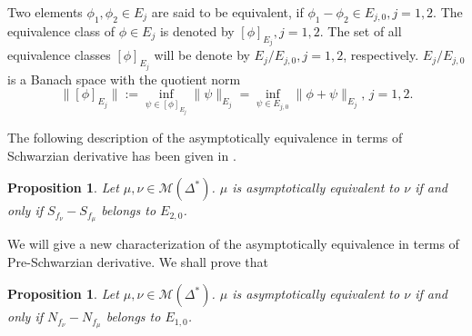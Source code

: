 \documentclass[11pt]{amsart}
\newtheorem{proposition}[theorem]{Proposition}
\theoremstyle{remark}
\theoremstyle{claim}
\theoremstyle{definition}
\theoremstyle{problem}
\theoremstyle{conjecture}
\theoremstyle{question}
\numberwithin{equation}{section}
\begin{document}
Two elements $\phi_1, \phi_2 \in E_j$ are said to be equivalent, if $\phi_1-\phi_2\in E_{j,0}, j=1,2$. The equivalence class of $\phi\in E_j$  is denoted by $[\phi]_{E_j}, j=1,2$.  The set of all equivalence classes $[\phi]_{E_j}$ will be denote by $E_j/E_{j,0}, j=1,2$, respectively. $E_j/E_{j,0}$ is a Banach space with the quotient norm
$$\|[\phi]_{E_j}\|:=\inf\limits_{\psi \in [\phi]_{E_j}} \|\psi\|_{E_j}=\inf\limits_{\psi \in E_{j,0}} \|\phi+\psi\|_{E_j},\, j=1,2.$$

The following description of the asymptotically equivalence in terms of Schwarzian derivative has been given in \cite{EMS}.
\begin{proposition}\label{ase-1}
Let $\mu, \nu \in \mathcal{M}({\Delta}^{*})$. $\mu$ is  asymptotically equivalent to $\nu$ if and only if $S_{f_{\nu}}-S_{f_{\mu}}$ belongs to $E_{2,0}$.
\end{proposition}
We will give a new characterization of the asymptotically equivalence in terms of Pre-Schwarzian derivative.
We shall prove that
\begin{proposition}\label{ase-2}
Let $\mu, \nu \in \mathcal{M}({\Delta}^{*})$. $\mu$ is  asymptotically equivalent to $\nu$ if and only if $N_{f_{\nu}}-N_{f_{\mu}}$ belongs to $E_{1,0}$.
\end{proposition}
\end{document}
